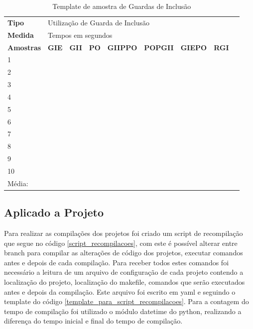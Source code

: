 \begin{table}[!ht]
\centering
\caption{Template de amostra de Guardas de Inclusão}
\label{tab:modelo_guards}
\begin{tiny}
\begin{tabular}{lp{1cm}p{1cm}p{1cm}p{1cm}p{1cm}p{1cm}p{1cm}p{1cm}}

\textbf{Tipo} & \multicolumn{7}{l}{Utilização de Guarda de Inclusão} \\
\textbf{Medida} & \multicolumn{7}{l}{Tempos em segundos } \\
\textbf{Amostras} & \textbf{GIE} & \textbf{GII} & \textbf{PO} & 
\textbf{GIIPPO} & \textbf{POPGII} & \textbf{GIEPO} & \textbf{RGI} \\ \toprule
 1  &  &  &   &   &   &   &  \\ 
 2  &  &  &   &   &   &   &  \\ 
 3  &  &  &   &   &   &   &  \\ 
 4  &  &  &   &   &   &   &  \\ 
 5  &  &  &   &   &   &   &  \\ 
 6  &  &  &   &   &   &   &  \\ 
 7  &  &  &   &   &   &   &  \\ 
 8  &  &  &   &   &   &   &  \\ 
 9  &  &  &   &   &   &   &  \\ 
 10 &  &  &   &   &   &   &  \\ \bottomrule
 Média: & & & & &   &   &    \\ 
\end{tabular}
\end{tiny}
\end{table}


\subsection{Aplicado a Projeto}

Para realizar as compilações dos projetos foi criado um script de recompilação que
 segue no código \ref{script_recompilacoes}, com este é possível alterar entre
 branch para compilar as alterações de código dos projetos,
 executar comandos antes e depois de cada compilação.
 Para receber todos estes comandos foi necessário a leitura de um arquivo de
 configuração de cada projeto contendo a localização do projeto,
 localização do makefile, comandos que serão executados antes e depois
 da compilação.
 Este arquivo foi escrito em yaml e seguindo o template do código
 \ref{template_para_script_recompilacoes}.
Para a contagem do tempo de compilação foi utilizado o módulo datetime do python,
 realizando a diferença do tempo inicial e final do tempo de compilação.

